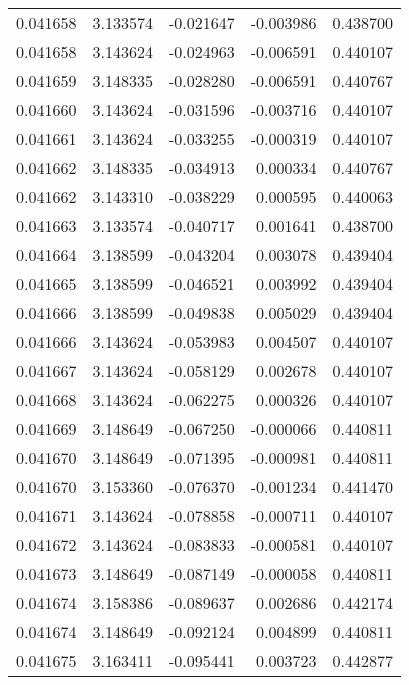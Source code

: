 \begin{tabular}{lrrrr}
0.041658    &  3.133574 & -0.021647 & -0.003986 &             0.438700 \\
0.041658    &  3.143624 & -0.024963 & -0.006591 &             0.440107 \\
0.041659    &  3.148335 & -0.028280 & -0.006591 &             0.440767 \\
0.041660    &  3.143624 & -0.031596 & -0.003716 &             0.440107 \\
0.041661    &  3.143624 & -0.033255 & -0.000319 &             0.440107 \\
0.041662    &  3.148335 & -0.034913 &  0.000334 &             0.440767 \\
0.041662    &  3.143310 & -0.038229 &  0.000595 &             0.440063 \\
0.041663    &  3.133574 & -0.040717 &  0.001641 &             0.438700 \\
0.041664    &  3.138599 & -0.043204 &  0.003078 &             0.439404 \\
0.041665    &  3.138599 & -0.046521 &  0.003992 &             0.439404 \\
0.041666    &  3.138599 & -0.049838 &  0.005029 &             0.439404 \\
0.041666    &  3.143624 & -0.053983 &  0.004507 &             0.440107 \\
0.041667    &  3.143624 & -0.058129 &  0.002678 &             0.440107 \\
0.041668    &  3.143624 & -0.062275 &  0.000326 &             0.440107 \\
0.041669    &  3.148649 & -0.067250 & -0.000066 &             0.440811 \\
0.041670    &  3.148649 & -0.071395 & -0.000981 &             0.440811 \\
0.041670    &  3.153360 & -0.076370 & -0.001234 &             0.441470 \\
0.041671    &  3.143624 & -0.078858 & -0.000711 &             0.440107 \\
0.041672    &  3.143624 & -0.083833 & -0.000581 &             0.440107 \\
0.041673    &  3.148649 & -0.087149 & -0.000058 &             0.440811 \\
0.041674    &  3.158386 & -0.089637 &  0.002686 &             0.442174 \\
0.041674    &  3.148649 & -0.092124 &  0.004899 &             0.440811 \\
0.041675    &  3.163411 & -0.095441 &  0.003723 &             0.442877 \\

\end{tabular}
